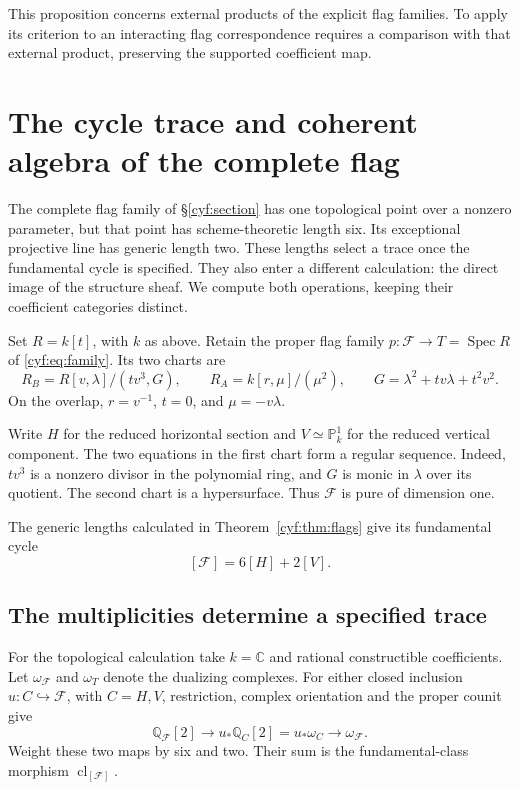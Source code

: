 This proposition concerns external products of the explicit
flag families. To apply its criterion to an interacting flag
correspondence requires a comparison with that external
product, preserving the supported coefficient map.

\section{The cycle trace and coherent algebra of the complete flag}
\label{cyt:section}

The complete flag family of \S\ref{cyf:section} has one
topological point over a nonzero parameter, but that point has
scheme-theoretic length six. Its exceptional projective line
has generic length two. These lengths select a trace once the
fundamental cycle is specified. They also enter a different
calculation: the direct image of the structure sheaf. We compute
both operations, keeping their coefficient categories distinct.

Set \(R=k[t]\), with \(k\) as above.
Retain the proper flag family \(p:\mathscr F\to T=\operatorname{Spec}R\)
of \eqref{cyf:eq:family}. Its two charts are
\begin{equation}\label{cyt:eq:charts}
 R_B=R[v,\lambda]/(tv^3,G),\qquad
 R_A=k[r,\mu]/(\mu^2),\qquad
 G=\lambda^2+tv\lambda+t^2v^2.
\end{equation}
On the overlap,
\(r=v^{-1}\), \(t=0\), and \(\mu=-v\lambda\).

Write \(H\) for the reduced horizontal section and
\(V\simeq\mathbb P^1_k\) for the reduced vertical component.
The two equations in the first chart form a regular sequence.
Indeed, \(tv^3\) is a nonzero divisor in the polynomial ring,
and \(G\) is monic in \(\lambda\) over its quotient.
The second chart is a hypersurface. Thus \(\mathscr F\) is
pure of dimension one.

The generic lengths calculated in
Theorem~\ref{cyf:thm:flags} give its fundamental cycle
\begin{equation}\label{cyt:eq:cycle}
                         [\mathscr F]=6[H]+2[V].
\end{equation}

\subsection{The multiplicities determine a specified trace}

For the topological calculation take \(k=\mathbb C\) and rational
constructible coefficients. Let \(\omega_{\mathscr F}\) and
\(\omega_T\) denote the dualizing complexes. For either closed
inclusion \(u:C\hookrightarrow\mathscr F\), with \(C=H,V\),
restriction, complex orientation and the proper counit give
\[
 \mathbb Q_{\mathscr F}[2]\longrightarrow
 u_*\mathbb Q_C[2]=u_*\omega_C\longrightarrow\omega_{\mathscr F}.
\]
Weight these two maps by six and two. Their sum is the
fundamental-class morphism \(\operatorname{cl}_{[\mathscr F]}\).


